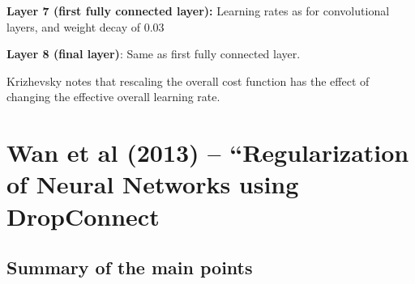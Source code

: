 \documentclass[12pt]{report}
\begin{document}
\textbf{Layer 7 (first fully connected layer):} Learning rates as for
convolutional layers, and weight decay of 0.03

\textbf{Layer 8 (final layer)}: Same as first fully connected layer.

Krizhevsky notes that rescaling the overall cost function has the
effect of changing the effective overall learning rate.


\section{Wan et al (2013) -- ``Regularization of Neural Networks using
  DropConnect}

\subsection{Summary of the main points} 
\end{document}
